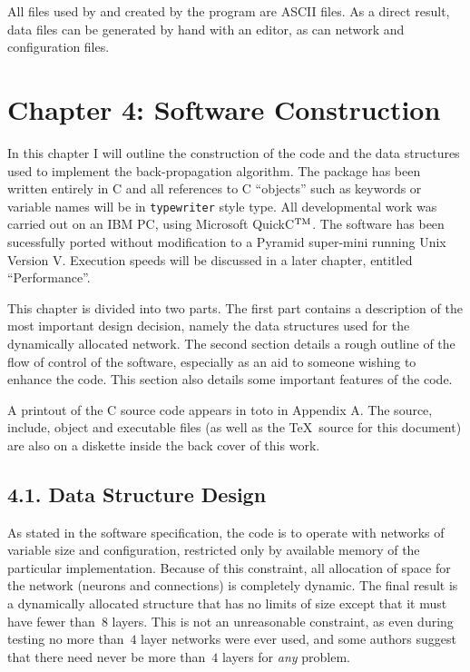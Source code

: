 \documentclass[12pt]{report}
\begin{document}
All files used by and created by the program are ASCII files.
As a direct result, data files can be generated by hand with an
editor, as can network and configuration files.






\chapter{Chapter 4: Software Construction}

In this chapter I will outline the construction of the code and the
data structures used to implement the back-propagation algorithm.
The package has been written entirely in C and all references to C
``objects'' such as keywords or variable names
will be in \texttt{typewriter} style type.
All developmental work was carried out on an IBM PC, using Microsoft
QuickC$^{\rm TM}$.
The software has been sucessfully ported without modification to a
Pyramid super-mini running Unix Version V.
Execution speeds will be discussed in a later chapter, entitled
``Performance''.

This chapter is divided into two parts.
The first part contains a description of the most important design
decision, namely the data structures used for the dynamically
allocated network.
The second section details a rough outline of the flow of control of
the software, especially as an aid to someone wishing to enhance the
code.
This section also details some important features of the code.

A printout of the C source code appears in toto in Appendix
A.
The source, include, object and executable files (as well as the
\TeX\ source for this document) are also on a diskette inside the
back cover of this work.

\section{4.1. Data Structure Design}

As stated in the software specification, the code is to
operate with networks of variable size and configuration, restricted
only by available memory of the particular implementation.
Because of this constraint, all allocation of space for the network
(neurons and connections) is completely dynamic.
The final result is a dynamically allocated structure that has no
limits of size except that it must have fewer than~$8$ layers.
This is not an unreasonable constraint, as even during testing
no more than~$4$ layer networks were ever used, and some authors suggest
that there need
never be more than~$4$ layers for {\sl any} problem.
\end{document}
